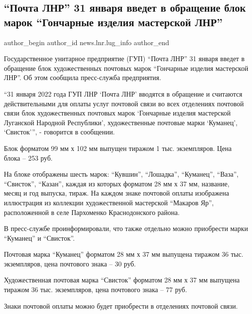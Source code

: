  
 
 
 
 
 
\subsection{\enquote{Почта ЛНР} 31 января введет в обращение блок марок \enquote{Гончарные изделия мастерской ЛНР}}
\label{sec:28_01_2022.stz.news.lnr.lug_info.1.pochta_lnr}
 
\ifcmt
 author_begin
   author_id news.lnr.lug_info
 author_end
\fi

Государственное унитарное предприятие (ГУП) \enquote{Почта ЛНР} 31 января введет в
обращение блок художественных почтовых марок \enquote{Гончарные изделия мастерской
ЛНР}. Об этом сообщила пресс-служба предприятия.


\enquote{31 января 2022 года ГУП ЛНР \enquote{Почта ЛНР} вводятся в обращение и считаются
действительными для оплаты услуг почтовой связи во всех отделениях почтовой
связи блок художественных почтовых марок \enquote{Гончарные изделия мастерской
Луганской Народной Республики}, художественные почтовые марки \enquote{Куманец},
\enquote{Свисток}}, - говорится в сообщении.

Блок форматом 99 мм х 102 мм выпущен тиражом 1 тыс. экземпляров. Цена блока –
253 руб.

На блоке отображены шесть марок: \enquote{Кувшин}, \enquote{Лошадка}, \enquote{Куманец}, \enquote{Ваза},
\enquote{Свисток}, \enquote{Казан}, каждая из которых форматом 28 мм х 37 мм, название, месяц и
год выпуска, тираж. На каждом знаке почтовой оплаты изображена иллюстрация из
коллекции художественной мастерской \enquote{Макаров Яр}, расположенной в селе
Пархоменко Краснодонского района.

В пресс-службе проинформировали, что также отдельно можно приобрести марки
\enquote{Куманец} и \enquote{Свисток}.

Почтовая марка \enquote{Куманец} форматом 28 мм х 37 мм выпущена тиражом 36 тыс.
экземпляров, цена почтового знака – 30 руб.

Художественная почтовая марка \enquote{Свисток} форматом 28 мм х 37 мм выпущена тиражом
36 тыс. экземпляров, цена почтового знака – 77 руб.

Знаки почтовой оплаты можно будет приобрести в отделениях почтовой связи.
